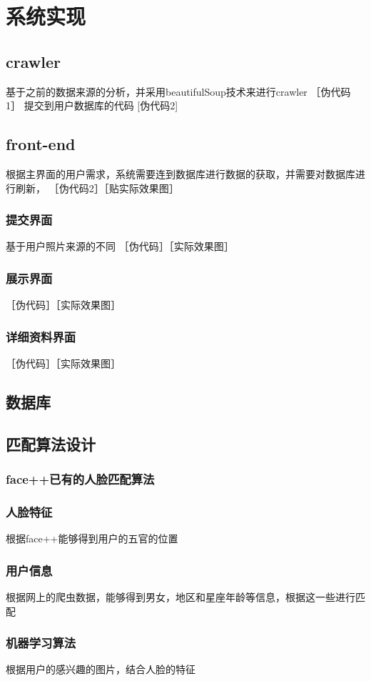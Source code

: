 
\chapter{系统实现}
\section{crawler}
基于之前的数据来源的分析，并采用beautifulSoup技术来进行crawler
［伪代码1］
提交到用户数据库的代码
[伪代码2]

\section{front-end}
根据主界面的用户需求，系统需要连到数据库进行数据的获取，并需要对数据库进行刷新，
［伪代码2］［贴实际效果图］
\subsection{提交界面}
基于用户照片来源的不同
［伪代码］［实际效果图］
\subsection{展示界面}
［伪代码］［实际效果图］
\subsection{详细资料界面}
［伪代码］［实际效果图］


\section{数据库}

\section{匹配算法设计}
\subsection{face++已有的人脸匹配算法}
\subsection{人脸特征}
根据face++能够得到用户的五官的位置
\subsection{用户信息}
根据网上的爬虫数据，能够得到男女，地区和星座年龄等信息，根据这一些进行匹配
\subsection{机器学习算法}
根据用户的感兴趣的图片，结合人脸的特征





